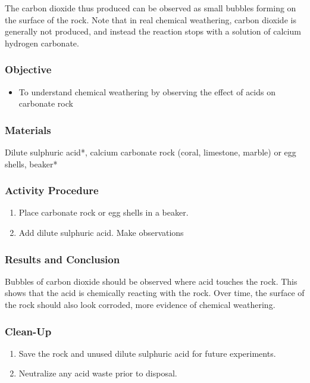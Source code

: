 \begin{center}
\end{center}

The carbon dioxide thus produced can be observed as small bubbles forming on the surface of the rock. Note that in real chemical weathering, carbon dioxide is generally not produced, and instead the reaction stops with a solution of calcium hydrogen carbonate.

\subsubsection{Objective}
\begin{itemize}
\item{To understand chemical weathering by observing the effect of acids on carbonate rock}
\end{itemize}

\subsubsection{Materials}
Dilute sulphuric acid*, calcium carbonate rock (coral, limestone, marble) or egg shells, beaker*

\subsubsection{Activity Procedure}
\begin{enumerate}
\item{Place carbonate rock or egg shells in a beaker.}
\item{Add dilute sulphuric acid. Make observations}
\end{enumerate}

\subsubsection{Results and Conclusion}
Bubbles of carbon dioxide should be observed where acid touches the rock. This shows that the acid is chemically reacting with the rock. Over time, the surface of the rock should also look corroded, more evidence of chemical weathering.

\subsubsection{Clean-Up}
\begin{enumerate}
\item{Save the rock and unused dilute sulphuric acid for future experiments.}
\item{Neutralize any acid waste prior to disposal.}
\end{enumerate}

